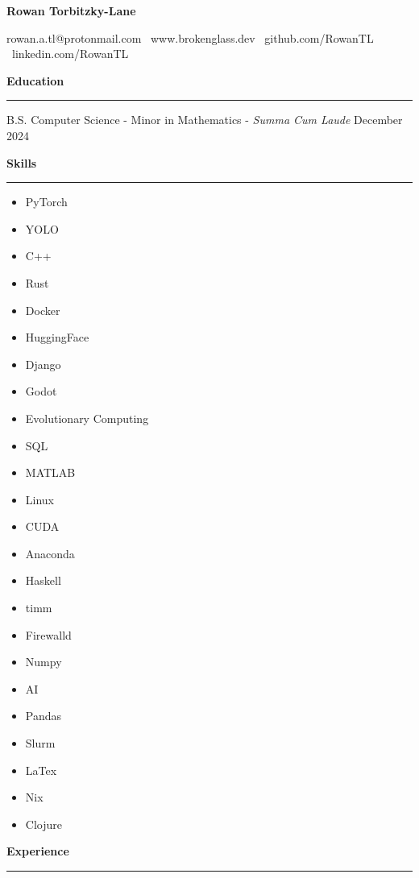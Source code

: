 \documentclass[11pt]{article}
\begin{document}
\begin{center}
    \textbf{\huge Rowan Torbitzky-Lane}\\
    \hrulefill
\end{center}

\begin{center}
    rowan.a.tl@protonmail.com \textbullet \ www.brokenglass.dev \textbullet \ github.com/RowanTL \textbullet  \ linkedin.com/RowanTL
\end{center}

\textbf{Education}\par
\vspace{-12pt}
\noindent\rule{\textwidth}{0.4pt}

B.S. Computer Science - Minor in Mathematics - \textit{Summa Cum Laude} \hfill December 2024

\textbf{Skills}\par
\vspace{-12pt}
\noindent\rule{\textwidth}{0.4pt}
\vspace{-24pt}  %
\begin{multicols}{3}
    \begin{itemize}[noitemsep, topsep=0pt, partopsep=0pt, parsep=0pt, itemsep=0pt]
        \small
        \item PyTorch
        \item YOLO
        \item C++
        \item Rust
        \item Docker
        \item HuggingFace
        \item Django
        \item Godot
        \item Evolutionary Computing
        \item SQL
        \item MATLAB
        \item Linux
        \item CUDA
        \item Anaconda
        \item Haskell
        \item timm
        \item Firewalld
        \item Numpy
        \item AI
        \item Pandas
        \item Slurm
        \item LaTex
        \item Nix
        \item Clojure
    \end{itemize}
\end{multicols}
\vspace{-10pt}  %
\textbf{Experience}\par
\vspace{-12pt}
\noindent\rule{\textwidth}{0.4pt}
\end{document}
